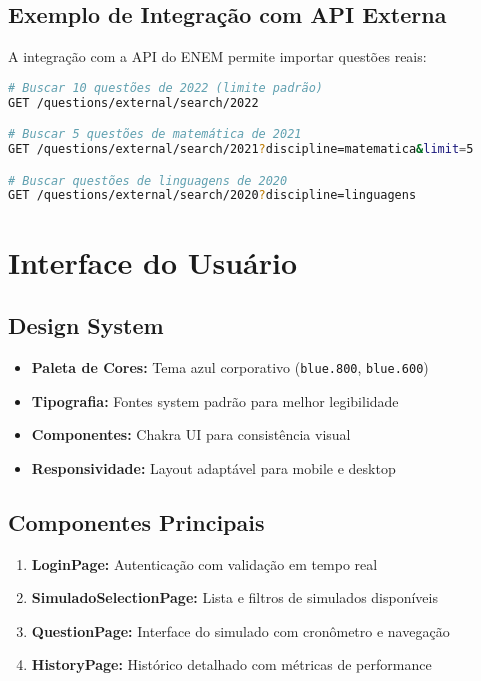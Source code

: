 \documentclass[12pt,a4paper]{article}
\begin{document}
\subsection{Exemplo de Integração com API Externa}
A integração com a API do ENEM permite importar questões reais:

\begin{lstlisting}[language=bash, caption=Exemplos de uso da API do ENEM]
# Buscar 10 questões de 2022 (limite padrão)
GET /questions/external/search/2022

# Buscar 5 questões de matemática de 2021
GET /questions/external/search/2021?discipline=matematica&limit=5

# Buscar questões de linguagens de 2020
GET /questions/external/search/2020?discipline=linguagens
\end{lstlisting}

\section{Interface do Usuário}

\subsection{Design System}
\begin{itemize}
    \item \textbf{Paleta de Cores:} Tema azul corporativo (\texttt{blue.800}, \texttt{blue.600})
    \item \textbf{Tipografia:} Fontes system padrão para melhor legibilidade
    \item \textbf{Componentes:} Chakra UI para consistência visual
    \item \textbf{Responsividade:} Layout adaptável para mobile e desktop
\end{itemize}

\subsection{Componentes Principais}
\begin{enumerate}
    \item \textbf{LoginPage:} Autenticação com validação em tempo real
    \item \textbf{SimuladoSelectionPage:} Lista e filtros de simulados disponíveis
    \item \textbf{QuestionPage:} Interface do simulado com cronômetro e navegação
    \item \textbf{HistoryPage:} Histórico detalhado com métricas de performance
\end{enumerate}
\end{document}
